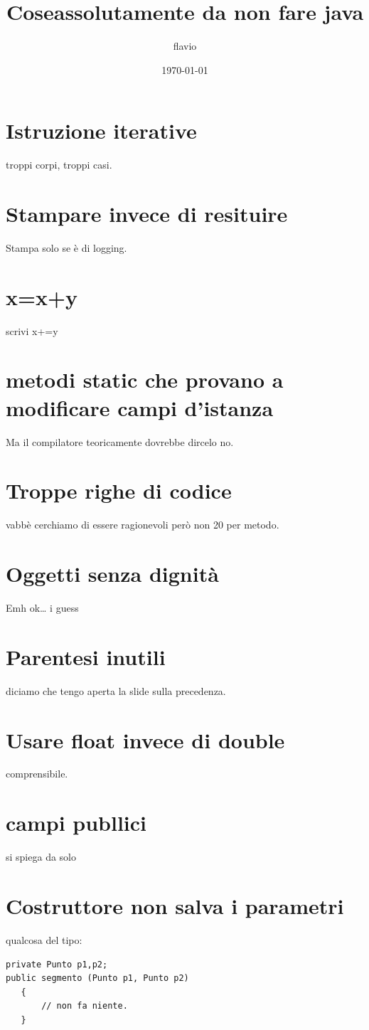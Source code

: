 \documentclass[11pt]{article}
\author{flavio}
\date{\today}
\title{Coseassolutamente da non fare java}
\begin{document}
\maketitle
\tableofcontents

\section{Istruzione iterative}
\label{sec:org8467330}
troppi corpi, troppi casi.
\section{Stampare invece di resituire}
\label{sec:orge3d0ca7}
Stampa solo se è di logging.
\section{x=x+y}
\label{sec:org1ca3216}
scrivi x+=y
\section{metodi static che provano a modificare campi d'istanza}
\label{sec:orgfe285e1}
Ma il compilatore teoricamente dovrebbe dircelo no.
\section{Troppe righe di codice}
\label{sec:orgdf5e37a}
vabbè cerchiamo di essere ragionevoli però non 20 per metodo.
\section{Oggetti senza dignità}
\label{sec:org4ac40d7}
Emh ok\ldots{} i guess
\section{Parentesi inutili}
\label{sec:org5e859fa}
diciamo che tengo aperta la slide sulla precedenza.
\section{Usare float invece di double}
\label{sec:orgd1f5c1d}
comprensibile.
\section{campi publlici}
\label{sec:orga4a8898}
si spiega da solo
\section{Costruttore non salva i parametri}
\label{sec:org07f2bc2}
qualcosa del tipo:
\begin{verbatim}
private Punto p1,p2;
public segmento (Punto p1, Punto p2)
   {
       // non fa niente.
   }
\end{verbatim}
\end{document}
